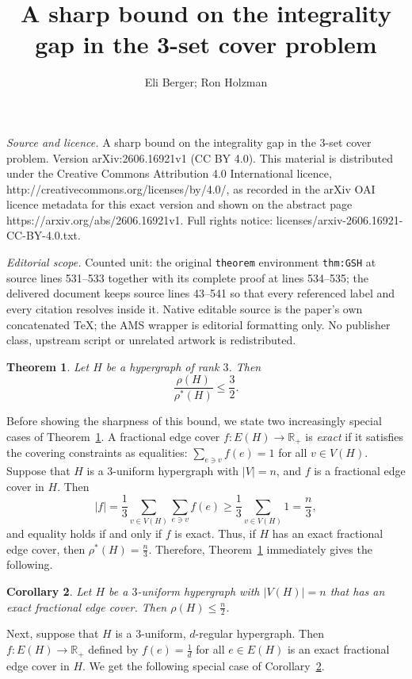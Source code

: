 \documentclass[10pt,a4paper]{amsart}
\newtheorem{theorem}{Theorem}[section]
\newtheorem{corollary}[theorem]{Corollary}
\begin{document}
\title[A sharp bound on the integrality gap in the 3-set cover prob]{A sharp bound on the integrality gap in the 3-set cover problem}
\author{Eli Berger; Ron Holzman}
\date{}
\maketitle
\noindent\emph{Source and licence.} A sharp bound on the integrality gap in the 3-set cover problem. Version arXiv:2606.16921v1 (CC BY 4.0). This material is distributed under the Creative Commons Attribution 4.0 International licence, http://creativecommons.org/licenses/by/4.0/, as recorded in the arXiv OAI licence metadata for this exact version and shown on the abstract page https://arxiv.org/abs/2606.16921v1. Full rights notice: licenses/arxiv-2606.16921-CC-BY-4.0.txt.\par\smallskip
\noindent\textit{Editorial scope.} Counted unit: the original \texttt{theorem} environment \texttt{thm:GSH} at source lines 531--533 together with its complete proof at lines 534--535; the delivered document keeps source lines 43--541 so that every referenced label and every citation resolves inside it. Native editable source is the paper's own concatenated TeX; the AMS wrapper is editorial formatting only. No publisher class, upstream script or unrelated artwork is redistributed.
\begin{theorem} \label{thm:3/2}
Let $H$ be a hypergraph of rank $3$. Then \[ \frac{\rho(H)}{\rho^*(H)} \le \frac{3}{2}.\]
\end{theorem}
Before showing the sharpness of this bound, we state two increasingly special cases of Theorem~\ref{thm:3/2}. A fractional edge cover $f: E(H) \to \mathbb{R}_+$ is \emph{exact} if it satisfies the covering constraints as equalities: $\sum_{e \ni v} f(e) = 1$ for all $v \in V(H)$. Suppose that $H$ is a $3$-uniform hypergraph with $|V|=n$, and $f$ is a fractional edge cover in $H$. Then \[ |f| = \frac{1}{3} \sum_{v \in V(H)} \sum_{e \ni v} f(e) \ge \frac{1}{3} \sum_{v \in V(H)} 1 = \frac{n}{3},\] and equality holds if and only if $f$ is exact. Thus, if $H$ has an exact fractional edge cover, then $\rho^*(H) = \frac{n}{3}$. Therefore, Theorem~\ref{thm:3/2} immediately gives the following.
\begin{corollary} \label{cor:Ex}
Let $H$ be a $3$-uniform hypergraph with $|V(H)|=n$ that has an exact fractional edge cover. Then $\rho(H) \le \frac{n}{2}$.
\end{corollary}
Next, suppose that $H$ is a $3$-uniform, $d$-regular hypergraph. Then $f: E(H) \to \mathbb{R}_+$ defined by $f(e) = \frac{1}{d}$ for all $e \in E(H)$ is an exact fractional edge cover in $H$. We get the following special case of Corollary~\ref{cor:Ex}.
\end{document}

